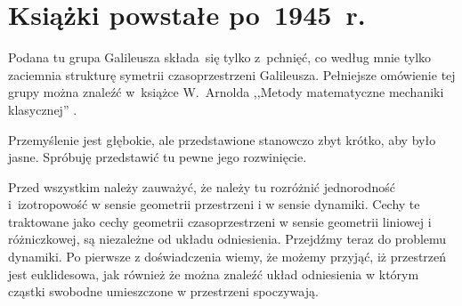 \documentclass[a4paper,11pt]{article}
\begin{document}
\vspace{\spaceTwo}










\newpage
\section{Książki powstałe po~1945~r.}

\vspace{\spaceTwo}







\start {} Podana tu grupa Galileusza składa~się tylko z~pchnięć,
co według mnie tylko zaciemnia strukturę symetrii czasoprzestrzeni
Galileusza. Pełniejsze omówienie tej grupy można znaleźć w~książce
W.~Arnolda ,,Metody matematyczne mechaniki klasycznej''
\cite{ArnoldMetodyMatematyczneMechanikiKlasycznej1981}.

\vspace{\spaceFour}



\start {} Przemyślenie jest głębokie, ale przedstawione
stanowczo zbyt krótko, aby było jasne. Spróbuję przedstawić tu pewne
jego rozwinięcie.

Przed wszystkim należy zauważyć, że należy tu rozróżnić jednorodność
i~izotropowość w sensie geometrii przestrzeni i w sensie dynamiki.
Cechy te traktowane jako cechy geometrii czasoprzestrzeni w sensie
geometrii liniowej i różniczkowej, są niezależne od układu
odniesienia. Przejdźmy teraz do problemu dynamiki. Po pierwsze z
doświadczenia wiemy, że możemy przyjąć, iż przestrzeń jest
euklidesowa, jak również że można znaleźć układ odniesienia w którym
cząstki swobodne umieszczone w przestrzeni spoczywają.

\vspace{\spaceFour}
\end{document}
